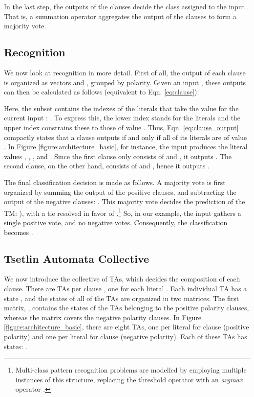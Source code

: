 \documentclass{article}
\begin{document}
In the last step, the outputs of the clauses decide the class  assigned to the input . That is, a summation operator aggregates the output of the clauses to form a majority vote. 

\subsection{Recognition}

We now look at recognition in more detail.  First of all, the output  of each clause is organized as vectors  and , grouped by polarity. Given an input , these outputs can then be calculated as follows (equivalent to Eqn. \ref{eq:clause}):

Here, the subset  contains the indexes of the literals that take the value  for the current input : . To express this, the lower index  stands for the literals and the upper index  constrains these to those of value . Thus, Eqn. \ref{eq:clause_output} compactly states that a clause outputs  if and only if all of its literals are of value . In Figure \ref{figure:architecture_basic}, for instance, the input  produces the literal values , , , and . Since the first clause only consists of  and , it outputs . The second clause, on the other hand, consists of  and , hence it outputs .

The final classification decision is made as follows. A majority vote is first organized by summing the output   of the positive clauses, and subtracting the output  of the negative clauses: . This majority vote decides the prediction of the TM: ), with a tie resolved in favor of .\footnote{Multi-class pattern recognition problems are modelled by employing multiple instances of this structure, replacing the threshold operator with an \textit{argmax} operator \cite{granmo2018tsetlin}.} So, in our example, the input  gathers a single positive vote, and no negative votes. Consequently, the classification becomes .

\subsection{Tsetlin Automata Collective}

We now introduce the collective of TAs, which decides the composition of each clause. There are  TAs per clause , one for each literal . Each individual TA has a state , and the states of all of the TAs are organized in two  matrices. The first matrix, , contains the states of the TAs belonging to the positive polarity clauses, whereas the matrix  covers the negative polarity clauses. In Figure \ref{figure:architecture_basic}, there are eight TAs, one per literal for clause  (positive polarity) and one per literal for clause  (negative polarity). Each of these TAs has  states: .
\end{document}
